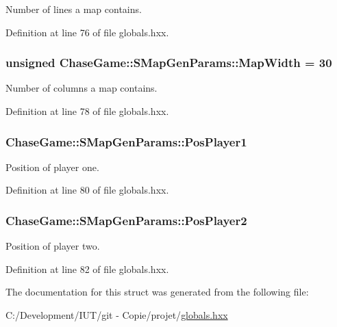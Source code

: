 Number of lines a map contains. 



Definition at line 76 of file globals.\-hxx.

\hypertarget{struct_chase_game_1_1_s_map_gen_params_a0897aeaa1a1a3a66697a6b441ca8c2de}{
\subsubsection[{Map\-Width}]{\setlength{\rightskip}{0pt plus 5cm}unsigned Chase\-Game\-::\-S\-Map\-Gen\-Params\-::\-Map\-Width = 30}}\label{struct_chase_game_1_1_s_map_gen_params_a0897aeaa1a1a3a66697a6b441ca8c2de}


Number of columns a map contains. 



Definition at line 78 of file globals.\-hxx.

\hypertarget{struct_chase_game_1_1_s_map_gen_params_a8db28a9ee45a200d67b20fc803645501}{
\subsubsection[{Pos\-Player1}]{ Chase\-Game\-::\-S\-Map\-Gen\-Params\-::\-Pos\-Player1}}\label{struct_chase_game_1_1_s_map_gen_params_a8db28a9ee45a200d67b20fc803645501}


Position of player one. 



Definition at line 80 of file globals.\-hxx.

\hypertarget{struct_chase_game_1_1_s_map_gen_params_afd0a0d4b22e228d547af88d38b6ae963}{
\subsubsection[{Pos\-Player2}]{ Chase\-Game\-::\-S\-Map\-Gen\-Params\-::\-Pos\-Player2}}\label{struct_chase_game_1_1_s_map_gen_params_afd0a0d4b22e228d547af88d38b6ae963}


Position of player two. 



Definition at line 82 of file globals.\-hxx.



The documentation for this struct was generated from the following file\-:\begin{DoxyCompactItemize}
\item 
C\-:/\-Development/\-I\-U\-T/git -\/ Copie/projet/\hyperlink{globals_8hxx}{globals.\-hxx}\end{DoxyCompactItemize}
